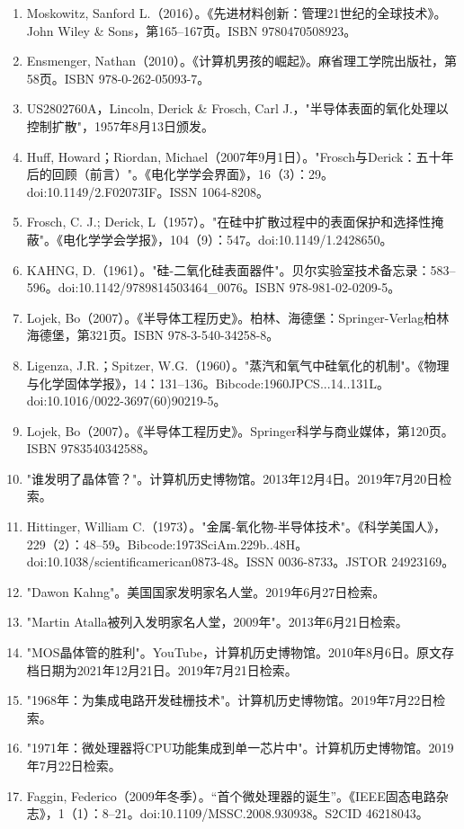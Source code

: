 \begin{enumerate}
\item Moskowitz, Sanford L.（2016）。《先进材料创新：管理21世纪的全球技术》。John Wiley & Sons，第165–167页。ISBN 9780470508923。
\item Ensmenger, Nathan（2010）。《计算机男孩的崛起》。麻省理工学院出版社，第58页。ISBN 978-0-262-05093-7。
\item US2802760A，Lincoln, Derick & Frosch, Carl J.，"半导体表面的氧化处理以控制扩散"，1957年8月13日颁发。
\item Huff, Howard；Riordan, Michael（2007年9月1日）。"Frosch与Derick：五十年后的回顾（前言）"。《电化学学会界面》，16（3）：29。doi:10.1149/2.F02073IF。ISSN 1064-8208。
\item Frosch, C. J.; Derick, L（1957）。"在硅中扩散过程中的表面保护和选择性掩蔽"。《电化学学会学报》，104（9）：547。doi:10.1149/1.2428650。
\item KAHNG, D.（1961）。"硅-二氧化硅表面器件"。贝尔实验室技术备忘录：583–596。doi:10.1142/9789814503464_0076。ISBN 978-981-02-0209-5。
\item Lojek, Bo（2007）。《半导体工程历史》。柏林、海德堡：Springer-Verlag柏林海德堡，第321页。ISBN 978-3-540-34258-8。
\item Ligenza, J.R.；Spitzer, W.G.（1960）。"蒸汽和氧气中硅氧化的机制"。《物理与化学固体学报》，14：131–136。Bibcode:1960JPCS...14..131L。doi:10.1016/0022-3697(60)90219-5。
\item Lojek, Bo（2007）。《半导体工程历史》。Springer科学与商业媒体，第120页。ISBN 9783540342588。
\item "谁发明了晶体管？"。计算机历史博物馆。2013年12月4日。2019年7月20日检索。
\item Hittinger, William C.（1973）。"金属-氧化物-半导体技术"。《科学美国人》，229（2）：48–59。Bibcode:1973SciAm.229b..48H。doi:10.1038/scientificamerican0873-48。ISSN 0036-8733。JSTOR 24923169。
\item "Dawon Kahng"。美国国家发明家名人堂。2019年6月27日检索。
\item "Martin Atalla被列入发明家名人堂，2009年"。2013年6月21日检索。
\item "MOS晶体管的胜利"。YouTube，计算机历史博物馆。2010年8月6日。原文存档日期为2021年12月21日。2019年7月21日检索。
\item "1968年：为集成电路开发硅栅技术"。计算机历史博物馆。2019年7月22日检索。
\item "1971年：微处理器将CPU功能集成到单一芯片中"。计算机历史博物馆。2019年7月22日检索。
\item Faggin, Federico（2009年冬季）。“首个微处理器的诞生”。《IEEE固态电路杂志》，1（1）：8–21。doi:10.1109/MSSC.2008.930938。S2CID 46218043。

\end{enumerate}
